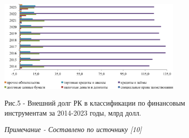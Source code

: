 \begin{figure}[H]
	\centering
	\includegraphics[width=0.8\textwidth]{media/ekon4/image16}
	\caption*{Рис.5 - Внешний долг РК в классификации по финансовым инструментам за 2014-2023 годы, млрд долл.}
	\caption*{\normalfont\emph{Примечание - Составлено по источнику {[}10{]}}}
\end{figure}

